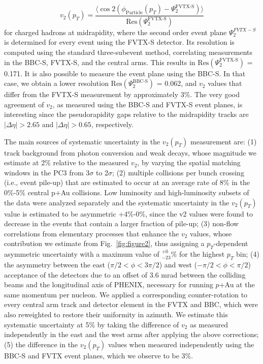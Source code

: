 \documentclass[%
reprint,
showpacs,preprintnumbers,
 amsmath,amssymb,
 aps,
]{revtex4-1}
\newcommand{\pt}{\mbox{$p_T$}\xspace}
\newcommand{\pau}{\mbox{$p$+Au}\xspace}
\begin{document}
\begin{equation}
v_{2}(p_{T}) = \frac{\langle \cos 2(\phi_{\text{Particle}}(p_{T})-\Psi^{\text{FVTX-S}}_{2})\rangle}{\text{Res}(\Psi^{\text{FVTX-S}}_{2})}
\end{equation}
for charged hadrons at midrapidity, where the second order event plane $\Psi^{FVTX-S}_{2}$ is determined for every event using the FVTX-S detector. Its resolution is computed using the standard three-subevent method, correlating measurements in the BBC-S, FVTX-S, and the central arms. This results in $\text{Res}(\Psi^{\text{FVTX-S}}_{2})$ = 0.171. It is also possible to measure the event plane using the BBC-S. In that case, we obtain a lower resolution $\text{Res}(\Psi^{\text{BBC-S}}_{2})$ = 0.062, and $v_2$ values that differ from the FVTX-S measurement by approximately 3\%. The very good agreement of $v_2$, as measured using the BBC-S and FVTX-S event planes, is interesting since the pseudorapidity gaps relative to the midrapidity tracks are $|\Delta\eta| > 2.65$ and $|\Delta\eta| > 0.65$, respectively.

The main sources of systematic uncertainty in the $v_2(p_T)$ measurement are: (1) track background from photon conversion and weak decays, whose magnitude we estimate at 2\% relative to the measured $v_2$, by varying the spatial matching windows in the PC3 from 3$\sigma$ to 2$\sigma$; (2) multiple collisions per bunch crossing (i.e., event pile-up) that are estimated to occur  at an average rate of 8\% in the 0\%-5\% central p+Au collisions. Low luminosity and high-luminosity subsets of the data were analyzed separately and the systematic uncertainty in the $v_2(p_T)$ value is estimated to be asymmetric  +4\%-0\%, since the v2  values were found to decrease in the events that contain a larger fraction of pile-up; (3) non-flow correlations from elementary processes that enhance the $v_2$ values, whose contribution we estimate from Fig.~\ref{fig:figure2}, thus assigning a \pt-dependent asymmetric uncertainty with a maximum value of $^{+0}_{-23}\%$ for the highest \pt bin; (4) the asymmetry between the east ($\pi/2 < \phi < 3\pi/2$) and west ($-\pi/2 < \phi < \pi/2$) acceptance of the detectors due to an offset of 3.6 mrad between the colliding beams and the longitudinal axis of PHENIX, necessary for running \pau at the same momentum per nucleon. We applied a corresponding counter-rotation to every central arm track and detector element in the FVTX and BBC, which were also reweighted to restore their uniformity in azimuth. We estimate this systematic uncertainty at 5\% by taking the difference of $v_2$ as measured independently in the east and the west arms after applying the above corrections; (5) the difference in the $v_2(p_T)$ values when measured independently using the BBC-S and FVTX event planes, which we observe to be 3\%. 
\end{document}
